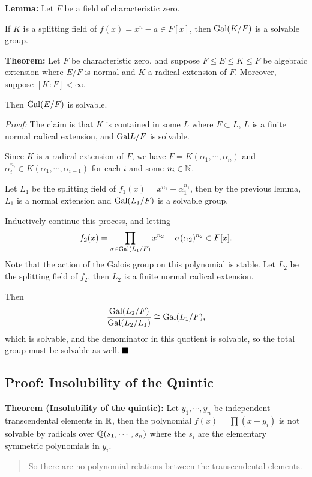 \textbf{Lemma:} Let \(F\) be a field of characteristic zero.

If \(K\) is a splitting field of \(f(x) = x^n - a \in F[x]\), then
\(\mathrm{Gal}(K/F)\) is a solvable group.

\textbf{Theorem:} Let \(F\) be characteristic zero, and suppose
\(F \leq E \leq K \leq \overline F\) be algebraic extension where
\(E/F\) is normal and \(K\) a radical extension of \(F\). Moreover,
suppose \([K:F] < \infty\).

Then \(\mathrm{Gal}(E/F)\) is solvable.

\emph{Proof:} The claim is that \(K\) is contained in some \(L\) where
\(F \subset L\), \(L\) is a finite normal radical extension, and
\(\mathrm{Gal}{L/F}\) is solvable.

Since \(K\) is a radical extension of \(F\), we have
\(F = K(\alpha_1, \cdots, \alpha_n)\) and
\(\alpha_i^{n_i} \in K(\alpha_1, \cdots, \alpha_{i-1})\) for each \(i\)
and some \(n_i \in {\mathbb{N}}\).

Let \(L_1\) be the splitting field of
\(f_1(x) = x^{n_1} - \alpha_1^{n_1}\), then by the previous lemma,
\(L_1\) is a normal extension and \(\mathrm{Gal}(L_1/F)\) is a solvable group.

Inductively continue this process, and letting \[
f_2(x) = \prod_{\sigma \in \mathrm{Gal}(L_1/F)} x^{n_2} - \sigma(\alpha_2)^{n_2} \in F[x]
.\] Note that the action of the Galois group on this polynomial is
stable. Let \(L_2\) be the splitting field of \(f_2\), then \(L_2\) is a
finite normal radical extension.

Then \[
\frac{ \mathrm{Gal}(L_2/F) }{ \mathrm{Gal}(L_2/L_1) } \cong \mathrm{Gal}(L_1/F)
,\] which is solvable, and the denominator in this quotient is solvable,
so the total group must be solvable as well. \(\qed\)

\hypertarget{proof-insolubility-of-the-quintic}{%
\subsection{Proof: Insolubility of the
Quintic}\label{proof-insolubility-of-the-quintic}}

\textbf{Theorem (Insolubility of the quintic):} Let \(y_1, \cdots, y_n\)
be independent transcendental elements in \({\mathbb{R}}\), then the polynomial
\(f(x) = \prod (x-y_i)\) is not solvable by radicals over
\({\mathbb{Q}}(s_1, \cdots, s_n)\) where the \(s_i\) are the elementary symmetric
polynomials in \(y_i\).

\begin{quote}
So there are no polynomial relations between the transcendental
elements.
\end{quote}

